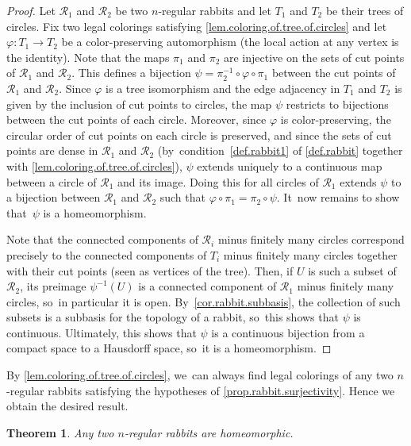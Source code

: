 \documentclass[10pt,a4paper]{amsart}
\newtheorem{theorem}{Theorem}[section]
\theoremstyle{definition}
\newcommand{\R}{\mathcal{R}}
\begin{document}
\begin{proof}
Let $\R_1$ and $\R_2$ be two $n$-regular rabbits and let $T_1$ and $T_2$ be their trees of circles.
Fix two legal colorings satisfying \cref{lem.coloring.of.tree.of.circles} and let $\varphi \colon T_1 \to T_2$ be a color-preserving automorphism (the local action at any vertex is the identity).
Note that the maps $\pi_1$ and $\pi_2$ are injective on the sets of cut points of $\R_1$ and $\R_2$.
This defines a bijection $\psi = \pi^{-1}_2 \circ \varphi \circ \pi_1$ between the cut points of $\R_1$ and $\R_2$.
Since $\varphi$ is a tree isomorphism and the edge adjacency in $T_1$ and $T_2$ is given by the inclusion of cut points to circles, the map $\psi$ restricts to bijections between the cut points of each circle.
Moreover, since $\varphi$ is color-preserving, the circular order of cut points on each circle is preserved, and since the sets of cut points are dense in $\R_1$ and $\R_2$ (by~condition~\cref{def.rabbit1} of \cref{def.rabbit} together with \cref{lem.coloring.of.tree.of.circles}), $\psi$ extends uniquely to a continuous map between a circle of $\R_1$ and its image.
Doing this for all circles of $\R_1$ extends $\psi$ to a bijection between $\R_1$ and $\R_2$ such that $\varphi \circ \pi_1 = \pi_2 \circ \psi$. It~now remains to show that~$\psi$ is a homeomorphism.

Note that the connected components of $\R_i$ minus finitely many circles correspond precisely to the connected components of $T_i$ minus finitely many circles together with their cut points (seen as vertices of the tree).
Then, if $U$ is such a subset of $\R_2$, its preimage $\psi^{-1}(U)$ is a connected component of $\R_1$ minus finitely many circles, so~in particular it is open. By~\cref{cor.rabbit.subbasis}, the collection of such subsets is a subbasis for the topology of a rabbit, so~this shows that $\psi$ is continuous.
Ultimately, this shows that $\psi$ is a continuous bijection from a compact space to a Hausdorff space, so~it is a homeomorphism.
\end{proof}

By \cref{lem.coloring.of.tree.of.circles}, we~can always find legal colorings of any two $n$-regular rabbits satisfying the hypotheses of \cref{prop.rabbit.surjectivity}.
Hence we obtain the desired result.

\begin{theorem}
\label{thm.uniqueness.rabbit}
Any two $n$-regular rabbits are homeomorphic.
\end{theorem}
\end{document}
